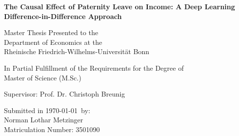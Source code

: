 

\begin{titlepage}

\begin{center}

\vspace*{0.4cm}

\Large {\bfseries The Causal Effect of Paternity Leave on Income: A Deep Learning Difference-in-Difference Approach}

\vspace{1cm}

\large {Master Thesis Presented to the}\\
\large {Department of Economics at the}\\
\large {Rheinische Friedrich-Wilhelms-Universität Bonn}\\

\end{center}

\vspace{1cm}

\begin{center}


\large {In Partial Fulfillment of the Requirements for the Degree of}\\
\large {Master of Science (M.Sc.)}\\

\end{center}
\vspace{1cm}
\begin{center}

\vspace*{1cm}


\large {Supervisor: Prof. Dr. Christoph Breunig}\\

\end{center}

\vspace{1cm}

\begin{center}

\vfill


\large {Submitted in \today \, by:}\\
\large {Norman Lothar Metzinger}\\
\large {Matriculation Number: 3501090}\\

\end{center}

\vspace{1cm}



\setcounter{page}{0}\clearpage




\end{titlepage}

\endinput
